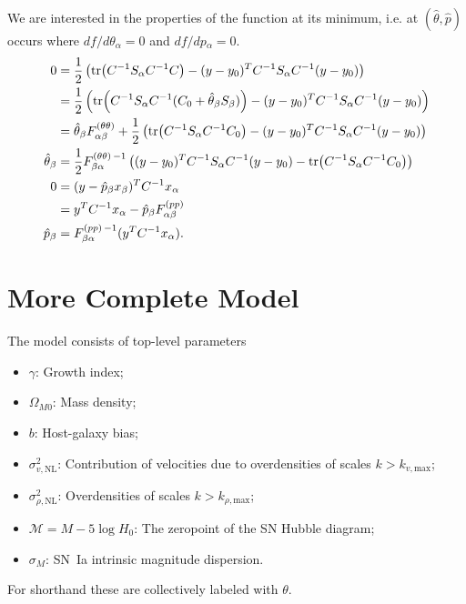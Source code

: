 \documentclass{article}
\begin{document}
We are interested in the properties of the function at its minimum, i.e. at $(\hat{\theta},\hat{p})$ occurs where $df/d\theta_\alpha=0 $ and $df/dp{_\alpha}=0$.
\begin{align}
0 & = \frac{1}{2}\left(\tr(C^{-1}S_\alpha C^{-1} C)  - (y-y_0)^T  C^{-1} S_{\alpha} C^{-1}  (y-y_0)\right) \\
& = \frac{1}{2}\left(\tr(C^{-1}S_\alpha C^{-1} (C_0 + \hat{\theta}_\beta S_\beta) )  - (y-y_0)^T  C^{-1} S_{\alpha} C^{-1}  (y-y_0)\right) \\
& =\hat{ \theta}_\beta F^{(\theta \theta)}_{\alpha \beta} +  \frac{1}{2}\left(\tr(C^{-1}S_\alpha C^{-1} C_0)  - (y-y_0)^T  C^{-1} S_{\alpha} C^{-1}  (y-y_0)\right) \\
\hat{ \theta}_\beta  & =  \frac{1}{2} F^{(\theta \theta)\, -1}_{\beta \alpha} \left( (y-y_0)^T  C^{-1} S_{\alpha} C^{-1}  (y-y_0) - \tr(C^{-1}S_\alpha C^{-1} C_0) \right) \\
0 &=  (y-\hat{p}_\beta x_\beta )^T C^{-1} x_\alpha \\
& = y^TC^{-1} x_\alpha - \hat{p}_\beta F^{(pp)}_{\alpha \beta} \\
 \hat{p}_\beta  & =   F^{(pp)\,-1}_{\beta \alpha} (y^TC^{-1} x_\alpha ).
\end{align}

\newpage
\section{More Complete Model}


The model consists of top-level parameters
\begin{itemize}
\item $\gamma$: Growth index;
\item $\Omega_{M0}$: Mass density;
\item $b$: Host-galaxy bias;
\item $\sigma^2_{v,\text{NL}}$: Contribution of velocities due to overdensities of scales $k>k_{v,\text{max}}$;
\item $\sigma^2_{\rho,\text{NL}}$: Overdensities of scales $k>k_{\rho,\text{max}}$;
\item $\mathcal{M} = M -5\log{H_0}$: The zeropoint of the SN Hubble diagram;
\item $\sigma_M$: SN~Ia intrinsic magnitude dispersion.
\end{itemize}
For shorthand these are collectively labeled with $\theta$.
\end{document}
